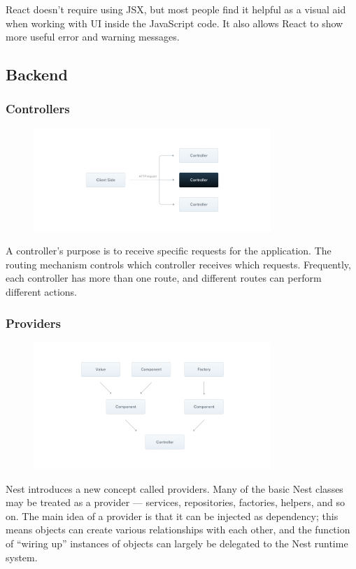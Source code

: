 \documentclass[a4paper]{article}
\numberwithin{equation}{section}
\begin{document}
React doesn’t require using JSX, but most people find it helpful as a visual aid when working with UI inside the JavaScript code. It also allows React to show more useful error and warning messages.

\subsection{Backend}
\subsubsection{Controllers}
\begin{figure}[H]
  \centering
  \includegraphics[width=0.8\textwidth]{./assets/p2/Controllers_1.png}
\end{figure}

A controller's purpose is to receive specific requests for the application.
The routing mechanism controls which controller receives which requests.
Frequently, each controller has more than one route, and different routes can perform different actions.

\subsubsection{Providers}
\begin{figure}[H]
  \centering
  \includegraphics[width=0.8\textwidth]{./assets/p2/Providers_1.png}
\end{figure}

Nest introduces a new concept called providers.
Many of the basic Nest classes may be treated as a provider --- services, repositories, factories, helpers, and so on.
The main idea of a provider is that it can be injected as dependency; this means objects can create various relationships with each other, and the function of ``wiring up'' instances of objects can largely be delegated to the Nest runtime system.
\end{document}
